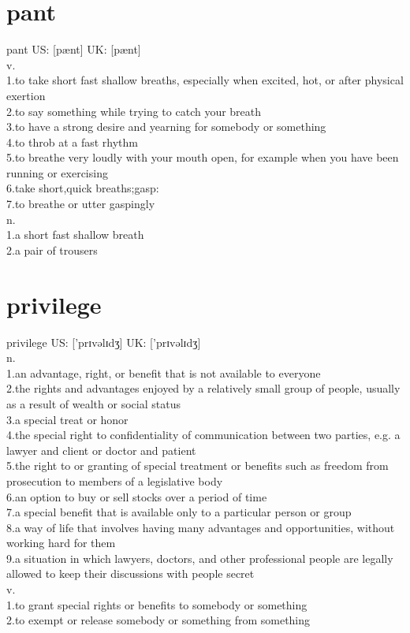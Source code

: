 \documentclass[11pt]{article}
\begin{document}
\section{pant}
\label{sec:orgbabe186}
pant US: [pænt] UK: [pænt]\\
v.\\
1.to take short fast shallow breaths, especially when excited, hot, or after physical exertion\\
2.to say something while trying to catch your breath\\
3.to have a strong desire and yearning for somebody or something\\
4.to throb at a fast rhythm\\
5.to breathe very loudly with your mouth open, for example when you have been running or exercising\\
6.take short,quick breaths;gasp:\\
7.to breathe or utter gaspingly\\
n.\\
1.a short fast shallow breath\\
2.a pair of trousers\\
\section{privilege}
\label{sec:org93ea33b}
privilege US: ['prɪvəlɪdʒ] UK: ['prɪvəlɪdʒ]\\
n.\\
1.an advantage, right, or benefit that is not available to everyone\\
2.the rights and advantages enjoyed by a relatively small group of people, usually as a result of wealth or social status\\
3.a special treat or honor\\
4.the special right to confidentiality of communication between two parties, e.g. a lawyer and client or doctor and patient\\
5.the right to or granting of special treatment or benefits such as freedom from prosecution to members of a legislative body\\
6.an option to buy or sell stocks over a period of time\\
7.a special benefit that is available only to a particular person or group\\
8.a way of life that involves having many advantages and opportunities, without working hard for them\\
9.a situation in which lawyers, doctors, and other professional people are legally allowed to keep their discussions with people secret\\
v.\\
1.to grant special rights or benefits to somebody or something\\
2.to exempt or release somebody or something from something\\
\end{document}
